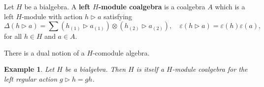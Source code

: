 \documentclass[12pt]{article}
\theoremstyle{inlinedefn}
\theoremstyle{break}
\newtheorem{example}{Example}
\begin{document}
Let $H$ be a bialgebra.
A \textbf{left $H$-module coalgebra} is a coalgebra $A$ which is a left $H$-module
with action $h \triangleright a$ satisfying
\begin{equation}
\Delta(h \triangleright a) = \sum (h_{(1)} \triangleright a_{(1)}) \otimes (h_{(2)} \triangleright a_{(2)}), \quad
\varepsilon(h \triangleright a) = \varepsilon(h) \varepsilon(a),
\end{equation}
for all $h \in H$ and $a \in A$.

There is a dual notion of a $H$-comodule algebra.

\begin{example}
Let $H$ be a bialgebra.
Then $H$ is itself a $H$-module coalgebra for the left regular action
$g \triangleright h = gh$.
\end{example}
\end{document}
